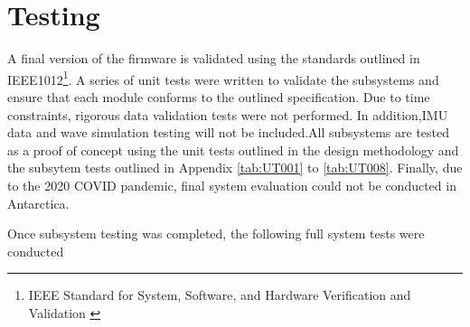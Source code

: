 
\chapter{Testing}
\label{ch:ch4}
A final version of the firmware is validated using the standards outlined in IEEE1012\footnote{IEEE Standard for System, Software, and Hardware Verification and Validation \cite{IEEE_STDVV}}. A series of unit tests were written to validate the subsystems and ensure that each module conforms to the outlined specification. Due to time constraints, rigorous data validation tests were not performed. In addition,IMU data and wave simulation testing will not be included.All subsystems are tested as a proof of concept using the unit tests outlined in the design methodology and the subsytem tests outlined in Appendix \ref{tab:UT001} to \ref{tab:UT008}. Finally, due to the 2020 COVID pandemic, final system evaluation could not be conducted in Antarctica. 

Once subsystem testing was completed, the following  full system tests were conducted

